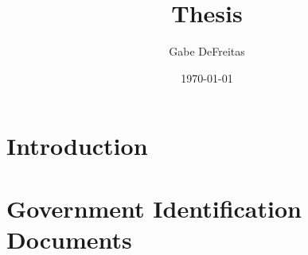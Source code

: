 \documentclass{report}
\title{Thesis}
\author{Gabe DeFreitas}
\date{\today}
\begin{document}
\maketitle
\tableofcontents

\chapter{Introduction}



\chapter{Government Identification Documents}




\printbibliography
\end{document}
